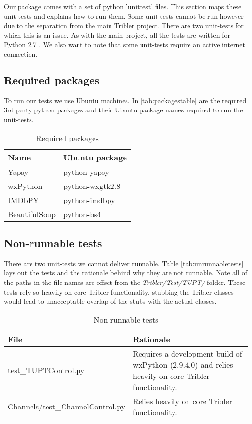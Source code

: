 Our package comes with a set of python 'unittest' files.
This section maps these unit-tests and explains how to run them.
Some unit-tests cannot be run however due to the separation from
the main Tribler project. There are two unit-tests for which this is an issue.
As with the main project, all the tests are written for Python 2.7 .
We also want to note that some unit-tests require an active internet connection.

\subsection{Required packages}
To run our tests we use Ubuntu machines.
In \autoref{tab:packagestable} are the required 3rd party python packages and their Ubuntu package names
required to run the unit-tests.

\begin{table}[h]
\caption{Required packages}
\label{tab:packagestable}
\begin{center}
\begin{tabular}{ l l }
	Name		& Ubuntu package \\
	\hline
	Yapsy		& python-yapsy	\\
	wxPython	& python-wxgtk2.8 \\
	IMDbPY		& python-imdbpy	\\
	BeautifulSoup	& python-bs4
\end{tabular}
\end{center}
\end{table}

\subsection{Non-runnable tests}
There are two unit-tests we cannot deliver runnable.
Table \autoref{tab:unrunnabletests} lays out the tests and the rationale behind why they are not runnable.
Note all of the paths in the file names are offset from the \textit{Tribler/Test/TUPT/} folder.
These tests rely so heavily on core Tribler functionality, stubbing the Tribler classes would lead to
unacceptable overlap of the stubs with the actual classes.

\begin{table}[h]
\caption{Non-runnable tests}
\label{tab:unrunnabletests}
\begin{center}
\begin{tabular*}{\textwidth}{ l p{}}
	File & Rationale \\
	\hline
	 test\_TUPTControl.py	& Requires a development build of wxPython (2.9.4.0) 
											and relies heavily on core Tribler functionality.\\
	Channels/test\_ChannelControl.py & Relies heavily on core Tribler functionality.
\end{tabular*}
\end{center}
\end{table}

